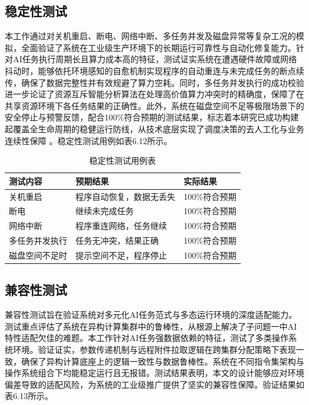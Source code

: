 \subsection{稳定性测试}

本工作通过对关机重启、断电、网络中断、多任务并发及磁盘异常等复杂工况的模拟，全面验证了系统在工业级生产环境下的长期运行可靠性与自动化修复能力。针对AI任务执行周期长且算力成本高的特征，测试证实系统在遭遇硬件故障或网络抖动时，能够依托环境感知的自愈机制实现程序的自动重连与未完成任务的断点续传，确保了数据完整性并有效规避了算力空耗。同时，多任务并发执行的成功校验进一步论证了资源互斥智能分析算法在处理高价值算力冲突时的精确度，保障了在共享资源环境下各任务结果的正确性。此外，系统在磁盘空间不足等极限场景下的安全停止与预警反馈，配合100\%符合预期的测试结果，标志着本研究已成功构建起覆盖全生命周期的稳健运行防线，从技术底层实现了调度决策的去人工化与业务连续性保障 。稳定性测试用例如表6.12所示。

\begin{table}[htbp]
\centering
\caption{稳定性测试用例表}
\begin{tabular}{lll}
\toprule
测试内容 & 预期结果 & 实际结果 \\
\midrule
关机重启 & 程序自动恢复，数据无丢失 &  100\%符合预期 \\
断电 & 继续未完成任务 &  100\%符合预期 \\
网络中断 & 程序重连网络，任务继续 &  100\%符合预期 \\
多任务并发执行 & 任务无冲突，结果正确 &  100\%符合预期 \\
磁盘空间不足时 & 提示空间不足，程序停止 &  100\%符合预期 \\
\bottomrule
\end{tabular}
\label{tab:my_label}
\end{table}

\subsection{兼容性测试}

兼容性测试旨在验证系统对多元化AI任务范式与多态运行环境的深度适配能力。测试重点评估了系统在异构计算集群中的鲁棒性，从根源上解决了子问题一中AI特性适配欠佳的难题。本工作针对AI任务强数据依赖的特征，测试了多类操作系统环境。验证证实，参数传递机制与远程附件拉取逻辑在跨集群分配策略下表现一致，确保了异构计算底座上的逻辑一致性与数据鲁棒性。系统在不同指令集架构与操作系统组合下均能稳定运行且无报错。测试结果表明，本文的设计能够应对环境偏差导致的适配风险，为系统的工业级推广提供了坚实的兼容性保障。验证结果如表6.13所示。

